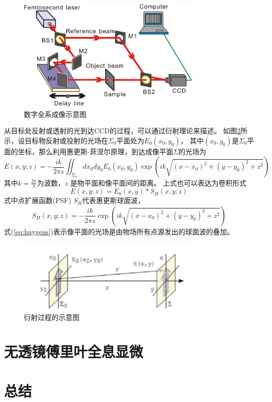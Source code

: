 \documentclass[11pt,a4paper]{article}
\begin{document}
\begin{figure}[htb]
  \centering
  \includegraphics[width=0.8\textwidth]{fig1.png}
  \caption{数字全系成像示意图}
  \label{fig:dh}
\end{figure}

从目标处反射或透射的光到达CCD的过程，可以通过衍射理论来描述。
如图\ref{fig:diffraction}所示，设目标物反射或投射的光场在$\Sigma_0$平面处为$E_0(x_0,y_0)$，
其中$(x_0, y_0)$是$\Sigma_0$平面的坐标，那么利用惠更斯-菲涅尔原理，到达成像平面$\Sigma$的光场为
\begin{equation}
E(x, y; z) = - \frac{i k}{2 \pi z} \iint_{\Sigma_0} dx_0 dy_0 E_0(x_0,y_0) \exp(i k \sqrt{(x-x_0)^2+(y-y_0)^2+z^2})
\label{eq:huygens}
\end{equation}
其中$k=\frac{2 \pi}{\lambda}$为波数，$z$ 是物平面和像平面间的距离。
上式也可以表达为卷积形式
\begin{equation}
E(x,y; z) = E_0(x , y) \ast S_H(x, y; z)
\end{equation}
式中点扩展函数(PSF) $S_H$代表惠更斯球面波，
\begin{equation}
S_H(x, y; z) =  - \frac{i k}{2 \pi z} \exp(i k \sqrt{(x-x_0)^2+(y-y_0)^2+z^2})
\end{equation}
式(\ref{eq:huygens})表示像平面的光场是由物场所有点源发出的球面波的叠加。

\begin{figure}[htb]
  \centering
  \includegraphics[width=0.8\textwidth]{diffraction.png}
  \caption{衍射过程的示意图}
  \label{fig:diffraction}
\end{figure}

\section{无透镜傅里叶全息显微}

\section{总结}




\end{document}
